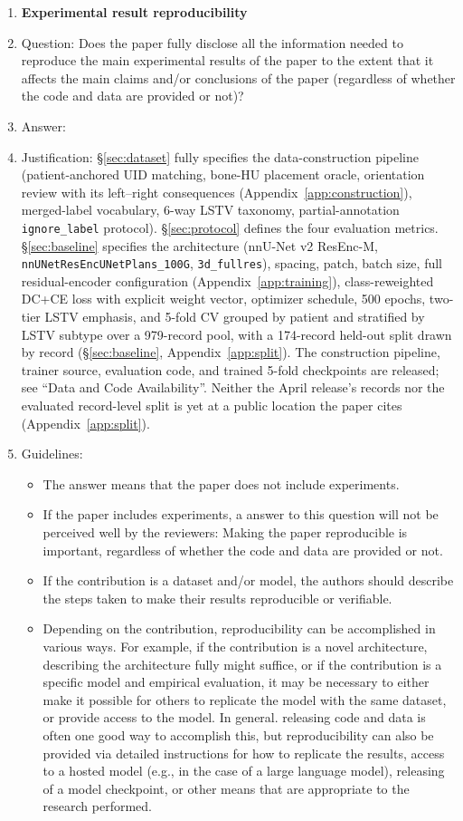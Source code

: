 \begin{enumerate}
    \item {\bf Experimental result reproducibility}
    \item[] Question: Does the paper fully disclose all the information needed to reproduce the main experimental results of the paper to the extent that it affects the main claims and/or conclusions of the paper (regardless of whether the code and data are provided or not)?
    \item[] Answer: \answerYes{}
    \item[] Justification: \S\ref{sec:dataset} fully specifies the data-construction pipeline (patient-anchored UID matching, bone-HU placement oracle, orientation review with its left--right consequences (Appendix~\ref{app:construction}), merged-label vocabulary, 6-way LSTV taxonomy, partial-annotation \texttt{ignore\_label} protocol). \S\ref{sec:protocol} defines the four evaluation metrics. \S\ref{sec:baseline} specifies the architecture (nnU-Net v2 ResEnc-M, \texttt{nnUNetResEncUNetPlans\_100G}, \texttt{3d\_fullres}), spacing, patch, batch size, full residual-encoder configuration (Appendix~\ref{app:training}), class-reweighted DC+CE loss with explicit weight vector, optimizer schedule, 500 epochs, two-tier LSTV emphasis, and 5-fold CV grouped by patient and stratified by LSTV subtype over a 979-record pool, with a 174-record held-out split drawn by record (\S\ref{sec:baseline}, Appendix~\ref{app:split}). The construction pipeline, trainer source, evaluation code, and trained 5-fold checkpoints are released; see ``Data and Code Availability''. Neither the April release's records nor the evaluated record-level split is yet at a public location the paper cites (Appendix~\ref{app:split}).
    \item[] Guidelines:
    \begin{itemize}
        \item The answer \answerNA{} means that the paper does not include experiments.
        \item If the paper includes experiments, a \answerNo{} answer to this question will not be perceived well by the reviewers: Making the paper reproducible is important, regardless of whether the code and data are provided or not.
        \item If the contribution is a dataset and\slash or model, the authors should describe the steps taken to make their results reproducible or verifiable.
        \item Depending on the contribution, reproducibility can be accomplished in various ways. For example, if the contribution is a novel architecture, describing the architecture fully might suffice, or if the contribution is a specific model and empirical evaluation, it may be necessary to either make it possible for others to replicate the model with the same dataset, or provide access to the model. In general. releasing code and data is often one good way to accomplish this, but reproducibility can also be provided via detailed instructions for how to replicate the results, access to a hosted model (e.g., in the case of a large language model), releasing of a model checkpoint, or other means that are appropriate to the research performed.

\end{itemize}
\end{enumerate}
